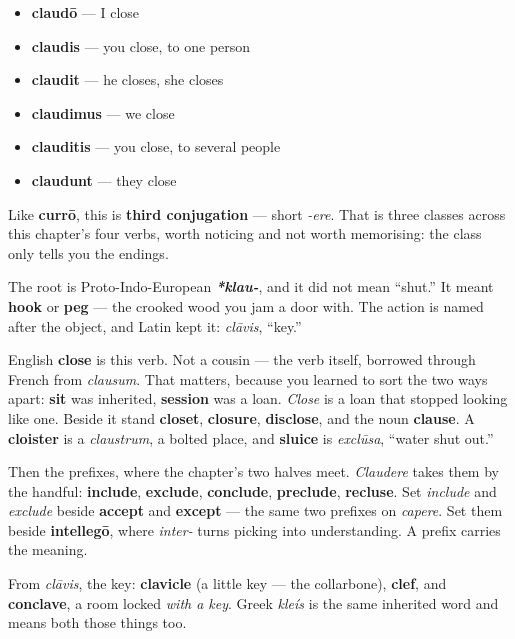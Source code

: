 \begin{itemize}
\raggedright
  \item \textbf{claudō} — I close
  \item \textbf{claudis} — you close, to one person
  \item \textbf{claudit} — he closes, she closes
  \item \textbf{claudimus} — we close
  \item \textbf{clauditis} — you close, to several people
  \item \textbf{claudunt} — they close
\end{itemize}

Like \textbf{currō}, this is \textbf{third conjugation} — short \emph{-ere}. That is three classes across this chapter's four verbs, worth noticing and not worth memorising: the class only tells you the endings.

\begin{cousinweb}
The root is Proto-Indo-European \emph{\textbf{*klau-}}, and it did not mean \textquotedblleft{}shut.\textquotedblright{} It meant \textbf{hook} or \textbf{peg} — the crooked wood you jam a door with. The action is named after the object, and Latin kept it: \emph{clāvis}, \textquotedblleft{}key.\textquotedblright{}

English \textbf{close} is this verb. Not a cousin — the verb itself, borrowed through French from \emph{clausum}. That matters, because you learned to sort the two ways apart: \textbf{sit} was inherited, \textbf{session} was a loan. \emph{Close} is a loan that stopped looking like one. Beside it stand \textbf{closet}, \textbf{closure}, \textbf{disclose}, and the noun \textbf{clause}. A \textbf{cloister} is a \emph{claustrum}, a bolted place, and \textbf{sluice} is \emph{exclūsa}, \textquotedblleft{}water shut out.\textquotedblright{}

Then the prefixes, where the chapter's two halves meet. \emph{Claudere} takes them by the handful: \textbf{include}, \textbf{exclude}, \textbf{conclude}, \textbf{preclude}, \textbf{recluse}. Set \emph{include} and \emph{exclude} beside \textbf{accept} and \textbf{except} — the same two prefixes on \emph{capere}. Set them beside \textbf{intellegō}, where \emph{inter-} turns picking into understanding. A prefix carries the meaning.

From \emph{clāvis}, the key: \textbf{clavicle} (a little key — the collarbone), \textbf{clef}, and \textbf{conclave}, a room locked \emph{with a key}. Greek \emph{kleís} is the same inherited word and means both those things too.
\end{cousinweb}

